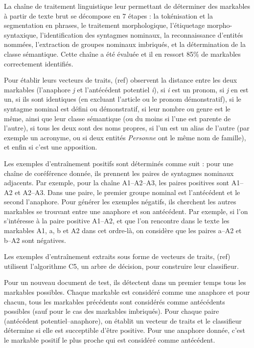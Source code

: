 \documentclass[a4paper,12pt]{article}
\begin{document}
La cha\^ine de traitement linguistique leur permettant de déterminer des markables à partir de texte brut se décompose en 7 étapes : la tokénisation et la segmentation en phrases, le traitement morphologique, l'étiquetage morpho-syntaxique, l'identification des syntagmes nominaux, la reconnaissance d'entités nommées, l'extraction de groupes nominaux imbriqués, et la détermination de la classe sémantique. Cette cha\^ine a été évaluée et il en ressort 85\% de markables correctement identifiés.

Pour établir leurs vecteurs de traits, (ref) observent la distance entre les deux markables (l'anaphore \textit{j} et l'antécédent potentiel \textit{i}), si \textit{i} est un pronom, si \textit{j} en est un, si ils sont identiques (en excluant l'article ou le pronom démonstratif), si le syntagme nominal est défini ou démonstratif, si leur nombre ou genre est le m\^eme, ainsi que leur classe sémantique (ou du moins si l'une est parente de l'autre), si tous les deux sont des noms propres, si l'un est un alias de l'autre (par exemple un acronyme, ou si deux entités \textit{Personne} ont le m\^eme nom de famille), et enfin si c'est une apposition.

Les exemples d'entra\^inement positifs sont déterminés comme suit : pour une cha\^ine de coréférence donnée, ils prennent les paires de syntagmes nominaux adjacents. Par exemple, pour la cha\^ine A1--A2--A3, les paires positives sont A1--A2 et A2--A3. Dans une paire, le premier groupe nominal est l'antécédent et le second l'anaphore. Pour générer les exemples négatifs, ils cherchent les autres markables se trouvant entre une anaphore et son antécédent. Par exemple, si l'on s'intéresse à la paire positive A1--A2, et que l'on rencontre dans le texte les markables A1, a, b et A2 dans cet ordre-là, on considère que les paires a--A2 et b--A2 sont négatives.

Les exemples d'entra\^inement extraits sous forme de vecteurs de traits, (ref) utilisent l'algorithme C5, un arbre de décision, pour construire leur classifieur.

Pour un nouveau document de test, ils détectent dans un premier temps tous les markables possibles. Chaque markable est considéré comme une anaphore et pour chacun, tous les markables précédents sont considérés comme antécédents possibles (sauf pour le cas des markables imbriqués). Pour chaque paire (antécédent potentiel--anaphore), on établit un vecteur de traits et le classifieur détermine si elle est succeptible d'\^etre positive. Pour une anaphore donnée, c'est le markable positif le plus proche qui est considéré comme antécédent.
\end{document}
